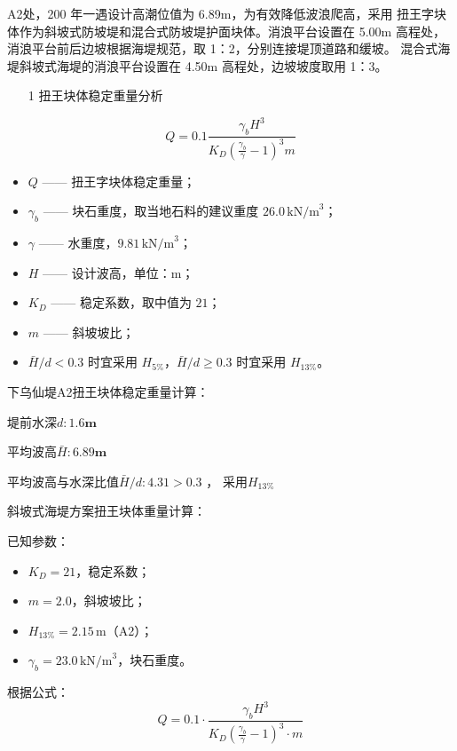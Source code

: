 \documentclass[UTF8, a4paper, 12pt]{ctexart} %
\begin{document}
A2处，200 年一遇设计高潮位值为 6.89m，为有效降低波浪爬高，采用
扭王字块体作为斜坡式防坡堤和混合式防坡堤护面块体。消浪平台设置在 5.00m
高程处，消浪平台前后边坡根据海堤规范，取 1：2，分别连接堤顶道路和缓坡。
混合式海堤斜坡式海堤的消浪平台设置在 4.50m 高程处，边坡坡度取用 1：3。
\begin{itemize}
    \item [1] 扭王块体稳定重量分析
\end{itemize}



\begin{equation}
    Q = 0.1 \frac{\gamma_b H^3}{K_D \left( \frac{\gamma_b}{\gamma} - 1 \right)^3 m}
\end{equation}

\begin{itemize}
    \item $Q$ —— 扭王字块体稳定重量；
    \item $\gamma_b$ —— 块石重度，取当地石料的建议重度 $26.0\,\text{kN/m}^3$；
    \item $\gamma$ —— 水重度，$9.81\,\text{kN/m}^3$；
    \item $H$ —— 设计波高，单位：$\text{m}$；
    \item $K_D$ —— 稳定系数，取中值为 $21$；
    \item $m$ —— 斜坡坡比；
    \item $\bar{H}/d < 0.3$ 时宜采用 $H_{5\%}$，$\bar{H}/d \geq 0.3$ 时宜采用 $H_{13\%}$。
\end{itemize}
下乌仙堤A2扭王块体稳定重量计算：

堤前水深$d:1.6\textbf{m}$
 
平均波高$\bar{H}:6.89\textbf{m}$

平均波高与水深比值$\bar{H}/d:4.31 > 0.3$ ， 采用$H_{13\%}$

斜坡式海堤方案扭王块体重量计算：

已知参数：
\begin{itemize}
    \item $K_D = 21$，稳定系数；
    \item $m = 2.0$，斜坡坡比；
    \item $H_{13\%} = 2.15\,\text{m}$（A2）；
    \item $\gamma_b = 23.0\,\text{kN/m}^3$，块石重度。
\end{itemize}

根据公式：
\begin{equation}
    Q = 0.1 \cdot \frac{\gamma_b H^3}{K_D \left( \frac{\gamma_b}{\gamma} - 1 \right)^3 \cdot m}
\end{equation}
\end{document}
